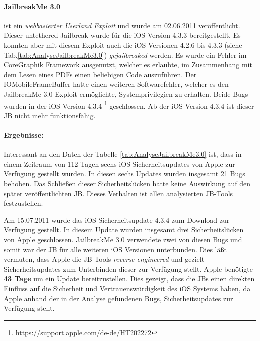 \paragraph{JailbreakMe 3.0} ist ein \textit{\glqq webbasierter Userland Exploit\grqq{}} und wurde am 02.06.2011 veröffentlicht. Dieser untethered Jailbreak wurde für die iOS Version 4.3.3 bereitgestellt. Es konnten aber mit diesem Exploit auch die iOS Versionen 4.2.6 bis 4.3.3 (siehe Tab.\ref{tab:AnalyseJailbreakMe3.0})  \textit{\glqq gejailbreaked\grqq{}} werden. 
Es wurde ein Fehler im CoreGraphik Framework ausgenutzt, welcher es erlaubte, im Zusammenhang mit dem Lesen eines PDFs einen beliebigen Code auszuführen. Der IOMobileFrameBuffer hatte einen weiteren Softwarefehler, welcher es den JailbreakMe 3.0 Exploit ermöglichte, Systemprivilegien zu erhalten. Beide Bugs wurden in der iOS Version 4.3.4 \footnote{\label{foot:iOS4.3.4}{\url{https://support.apple.com/de-de/HT202272}}} geschlossen. Ab der iOS Version 4.3.4 ist dieser JB nicht mehr funktionsfähig.
 
\paragraph{Ergebnisse:} Interessant an den Daten der Tabelle \ref{tab:AnalyseJailbreakMe3.0} ist, dass in einem Zeitraum von 112 Tagen sechs iOS Sicherheitsupdates von Apple zur Verfügung gestellt wurden. In diesen sechs Updates wurden insgesamt 21 Bugs behoben. Das Schließen dieser Sicherheitslücken hatte keine Auswirkung auf den später veröffentlichten JB. Dieses Verhalten ist allen analysierten JB-Tools festzustellen. \par  
Am 15.07.2011 wurde das iOS Sicherheitsupdate 4.3.4 zum Download zur Verfügung gestellt. In diesem Update wurden insgesamt drei Sicherheitslücken von Apple geschlossen. JailbreakMe 3.0 verwendete zwei von diesen Bugs und somit war der JB für alle weiteren iOS Versionen unterbunden. Dies läßt vermuten, dass Apple die JB-Tools \textit{\glqq reverse engineered\grqq{}} und gezielt Sicherheitsupdates zum Unterbinden dieser zur Verfügung stellt. Apple benötigte \textbf{43 Tage} um ein Update bereitzustellen. Dies gezeigt, dass die JBs einen direkten Einfluss auf die Sicherheit und Vertrauenswürdigkeit des iOS Systems haben, da Apple anhand der in der Analyse gefundenen Bugs, Sicherheitsupdates zur Verfügung stellt. \par 


